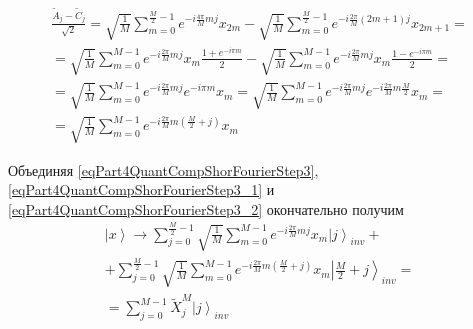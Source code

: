\begin{eqnarray}
\frac{\tilde{A}_{j} - \tilde{C}_{j} }{\sqrt{2}} = 
\sqrt{\frac{1}{M}} 
\sum_{m = 0}^{\frac{M}{2} - 1} e^{-i \frac{4 \pi}{M} m j} x_{2m}  -
\sqrt{\frac{1}{M}} 
\sum_{m = 0}^{\frac{M}{2} - 1} 
e^{-i \frac{2 \pi}{M} \left(2m+1\right) j} x_{2m+1}
= 
\nonumber \\
=
\sqrt{\frac{1}{M}} \sum_{m = 0}^{M - 1}
e^{-i \frac{2 \pi}{M} m j} x_{m} \frac{1 + e^{-i \pi m}}{2}
-
\sqrt{\frac{1}{M}} \sum_{m = 0}^{M - 1}
e^{-i \frac{2 \pi}{M} m j} x_{m} \frac{1 - e^{-i \pi m}}{2} 
=
\nonumber \\
=
\sqrt{\frac{1}{M}} \sum_{m = 0}^{M - 1}
e^{-i \frac{2 \pi}{M} m j} e^{-i \pi m } x_{m} 
=
\sqrt{\frac{1}{M}} \sum_{m = 0}^{M - 1}
e^{-i \frac{2 \pi}{M} m j} e^{-i \frac{2 \pi}{M} m \frac{M}{2} } x_{m} 
=
\nonumber \\
=
\sqrt{\frac{1}{M}} \sum_{m = 0}^{M - 1}
e^{-i \frac{2 \pi}{M} m \left(\frac{M}{2} + j\right)} x_{m}
\label{eqPart4QuantCompShorFourierStep3_2}
\end{eqnarray}

Объединяя \eqref{eqPart4QuantCompShorFourierStep3}, 
\eqref{eqPart4QuantCompShorFourierStep3_1} и
\eqref{eqPart4QuantCompShorFourierStep3_2} окончательно получим 
\begin{eqnarray}
\left|x\right> \rightarrow
\sum_{j = 0}^{\frac{M}{2} - 1} \sqrt{\frac{1}{M}} \sum_{m = 0}^{M - 1}
e^{-i \frac{2 \pi}{M} m j} x_{m} \left|j\right>_{inv} +
\nonumber \\
+
\sum_{j = 0}^{\frac{M}{2} - 1} \sqrt{\frac{1}{M}} \sum_{m = 0}^{M - 1}
e^{-i \frac{2 \pi}{M} m \left(\frac{M}{2} + j\right)} x_{m} 
\left|\frac{M}{2} + j\right>_{inv} =
\nonumber \\
= \sum_{j = 0}^{M - 1} \tilde{X}_j^{M} \left|j\right>_{inv}
\nonumber
\end{eqnarray}
